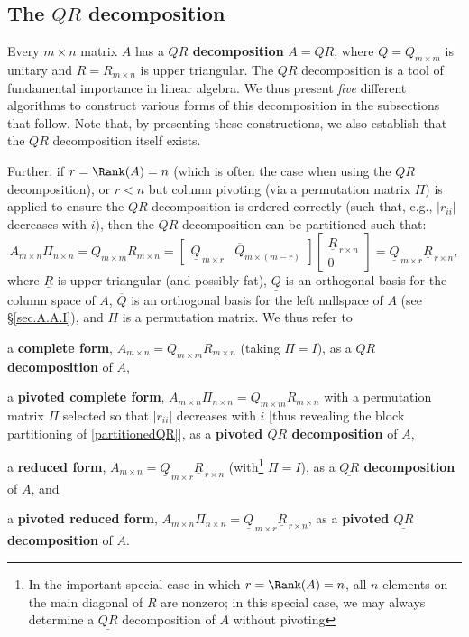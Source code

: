 \subsection{The $QR$ decomposition}\label{sec.A.D.B}\enlargethispage{3pt}

Every $m\times n$ matrix $A$ has a {\bf $QR$ decomposition} $A=QR$,
where $Q=Q_{m\times m}$ is unitary and $R=R_{m\times n}$ is upper
triangular.  The $QR$ decomposition is a tool of fundamental
importance in linear algebra.  We thus present {\it five} different algorithms to construct various forms
of this decomposition in the subsections that follow.  Note that, by presenting these constructions, we also establish that the
$QR$ decomposition itself exists.

Further, if $r=\Rank(A)=n$ (which is often the case when using the $QR$ decomposition),
or $r<n$ but column pivoting (via a permutation matrix $\Pi$)
is applied to ensure the $QR$ decomposition is ordered correctly (such that, e.g., $|r_{ii}|$ decreases with $i$),
then the $QR$ decomposition can be partitioned such that:
\begin{equation}
  A_{m\times n} \Pi_{n\times n} =Q_{m\times m} R_{m\times n} = 
  \begin{bmatrix} {\underline{Q}}_{\,m \times r} & {\overline Q}_{m \times (m-r)} \end{bmatrix}
  \begin{bmatrix} {\underline{R}}_{\,r \times n} \\ {0} \end{bmatrix} =
      {\underline{Q}}_{\,m \times r} {\underline{R}}_{\,r \times n},
      \label{partitionedQR}
\end{equation}
where ${\underline{R}}$ is upper triangular (and possibly fat), $\underline{Q}$ is an orthogonal basis for the column space of $A$,
$\overline Q$ is an orthogonal basis for the left nullspace of $A$ (see \S \ref{sec.A.A.I}), and $\Pi$ is a permutation matrix.
We thus refer to
\beginmylistb
\item a {\bf complete form}, $A_{m\times n}=Q_{m\times m} R_{m\times n}$ (taking $\Pi=I$), as a $QR$ {\bf decomposition} of $A$, 
\item a {\bf pivoted complete form}, $A_{m\times n} \Pi_{n\times n}=Q_{m\times m} R_{m\times n}$ with a permutation matrix $\Pi$ selected so that
$|r_{ii}|$ decreases with $i$ [thus revealing the block partitioning of \eqref{partitionedQR}], as a {\bf pivoted $QR$ decomposition} of $A$, 
\item a {\bf reduced form}, $A_{m\times n}={\underline{Q}}_{\,m \times r} {\underline{R}}_{\,r \times n}$ (with\footnote{In the important
special case in which $r=\Rank(A)=n$, all $n$ elements on the main diagonal of $R$ are nonzero; in this special case, we may always determine a
$\underline{QR}$ decomposition of $A$ without pivoting} $\Pi=I$), as a {\bf $\underline{QR}$ decomposition} of $A$, and
\item a {\bf pivoted reduced form}, $A_{m\times n} \Pi_{n\times n}={\underline{Q}}_{\,m \times r} {\underline{R}}_{\,r \times n}$, as a {\bf pivoted $\underline{QR}$ decomposition} of $A$.  
\endmylist
\clearpage

